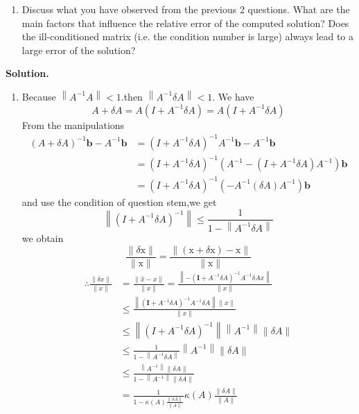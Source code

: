 \documentclass[english,onecolumn]{IEEEtran}
\begin{document}
\begin{enumerate}
    
    \item Discuss what you have observed from the previous 2 questions. What are the main factors that influence the relative error of the computed solution? Does the ill-conditioned matrix (i.e. the condition number is large) always lead to a large error of the solution?     
\end{enumerate}

\noindent\textbf{Solution.}
\begin{enumerate}
    \item 
Because $\left\|A^{-1} A\right\|<1$.then $\left\|A^{-1} \delta A\right\|<1$. We have
$$
A+\delta A=A\left(I+A^{-1} \delta A\right)=A(I+A^{-1} \delta A)
$$
From the manipulations
$$
\begin{aligned}
(A+\delta A)^{-1} \mathbf{b}-A^{-1} \mathbf{b} &=\left(I+A^{-1} \delta A\right)^{-1} A^{-1} \mathbf{b}-A^{-1} \mathbf{b} \\
&=\left(I+A^{-1} \delta A\right)^{-1}\left(A^{-1}-\left(I+A^{-1} \delta A\right) A^{-1}\right) \mathbf{b} \\
&=\left(I+A^{-1} \delta A\right)^{-1}\left(-A^{-1}(\delta A) A^{-1}\right) \mathbf{b}
\end{aligned}
$$
and use the condition of question stem,we get
$$
\left\|(I+A^{-1} \delta A)^{-1}\right\| \leq \frac{1}{1-\left\|A^{-1} \delta A\right\|}
$$
we obtain
$$
\frac{\|\delta \mathrm{x}\|}{\|\mathrm{x}\|}=\frac{\|(\mathrm{x}+\delta \mathrm{x})-\mathrm{x}\|}{\|\mathrm{x}\|}
$$
$$
\begin{aligned}
\therefore \frac{\|\delta x\|}{\|x\|} &=\frac{\|\hat{x}-x\|}{\|x\|}=\frac{\left\|-\left(\mathbf{I}+A^{-1} \delta A\right)^{-1} A^{-1} \delta A x\right\|}{\|x\|} \\
& \leq \frac{\left\|\left(\mathbf{I}+A^{-1} \delta A\right)^{-1} A^{-1} \delta A\right\|\|x\|}{\|x\|} \\
& \leq\left\|\left(I+A^{-1} \delta A\right)^{-1}\right\|\left\|A^{-1}\right\|\|\delta A\| \\
& \leq \frac{1}{1-\left\|A^{-1} \delta A\right\|}\left\|A^{-1}\right\|\|\delta A\| \\
& \leq \frac{\left\|A^{-1}\right\|\|\delta A\|}{1-\left\|A^{-1}\right\|\|\delta A\|} \\
&=\frac{1}{1-\kappa(A) \frac{\|\delta A\|}{\|A\|}} \kappa(A) \frac{\|\delta A\|}{\|A\|}
\end{aligned}
$$




\end{enumerate}
\end{document}
